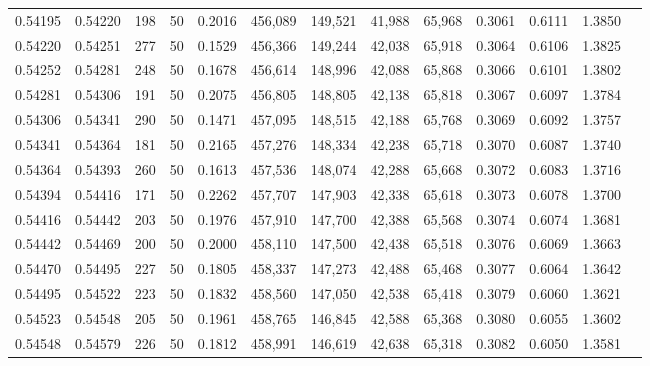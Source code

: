 \begin{tabular}{rrrrrrrrrrrrr}
0.54195 & 0.54220 &   198 &  50 &                                     0.2016 & 456,089 & 149,521 &  41,988 &  65,968 & 0.3061 & 0.6111 & 1.3850 \\
0.54220 & 0.54251 &   277 &  50 &                                     0.1529 & 456,366 & 149,244 &  42,038 &  65,918 & 0.3064 & 0.6106 & 1.3825 \\
0.54252 & 0.54281 &   248 &  50 &                                     0.1678 & 456,614 & 148,996 &  42,088 &  65,868 & 0.3066 & 0.6101 & 1.3802 \\
0.54281 & 0.54306 &   191 &  50 &                                     0.2075 & 456,805 & 148,805 &  42,138 &  65,818 & 0.3067 & 0.6097 & 1.3784 \\
0.54306 & 0.54341 &   290 &  50 &                                     0.1471 & 457,095 & 148,515 &  42,188 &  65,768 & 0.3069 & 0.6092 & 1.3757 \\
0.54341 & 0.54364 &   181 &  50 &                                     0.2165 & 457,276 & 148,334 &  42,238 &  65,718 & 0.3070 & 0.6087 & 1.3740 \\
0.54364 & 0.54393 &   260 &  50 &                                     0.1613 & 457,536 & 148,074 &  42,288 &  65,668 & 0.3072 & 0.6083 & 1.3716 \\
0.54394 & 0.54416 &   171 &  50 &                                     0.2262 & 457,707 & 147,903 &  42,338 &  65,618 & 0.3073 & 0.6078 & 1.3700 \\
0.54416 & 0.54442 &   203 &  50 &                                     0.1976 & 457,910 & 147,700 &  42,388 &  65,568 & 0.3074 & 0.6074 & 1.3681 \\
0.54442 & 0.54469 &   200 &  50 &                                     0.2000 & 458,110 & 147,500 &  42,438 &  65,518 & 0.3076 & 0.6069 & 1.3663 \\
0.54470 & 0.54495 &   227 &  50 &                                     0.1805 & 458,337 & 147,273 &  42,488 &  65,468 & 0.3077 & 0.6064 & 1.3642 \\
0.54495 & 0.54522 &   223 &  50 &                                     0.1832 & 458,560 & 147,050 &  42,538 &  65,418 & 0.3079 & 0.6060 & 1.3621 \\
0.54523 & 0.54548 &   205 &  50 &                                     0.1961 & 458,765 & 146,845 &  42,588 &  65,368 & 0.3080 & 0.6055 & 1.3602 \\
0.54548 & 0.54579 &   226 &  50 &                                     0.1812 & 458,991 & 146,619 &  42,638 &  65,318 & 0.3082 & 0.6050 & 1.3581 \\

\end{tabular}
